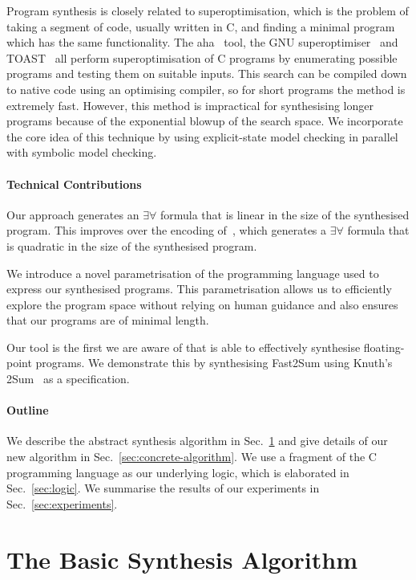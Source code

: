 \documentclass[a4paper]{llncs}
\begin{document}
Program synthesis is closely related to
superoptimisation, which is the problem of taking a
segment of code, usually written in C, and finding a minimal program which
has the same functionality.  The {\sc aha}~\cite{aha-paper} tool, the GNU
superoptimiser~\cite{gnu-superoptimiser} and TOAST~\cite{toast} all perform superoptimisation of C
programs by enumerating possible programs and testing them on suitable
inputs.  This search can be compiled down to native code using an optimising
compiler, so for short programs the method is extremely fast.  However, this
method is impractical for synthesising longer programs because of the
exponential blowup of the search space.  We incorporate the core idea of
this technique by using explicit-state model checking in parallel with
symbolic model checking.

\paragraph{Technical Contributions}
Our approach generates an $\exists \forall$ formula that is linear
in the size of the synthesised program.  This improves over the
encoding of~\cite{brahma}, which generates a $\exists \forall$ formula
that is quadratic in the size of the synthesised program.

We introduce a novel parametrisation of the programming language
used to express our synthesised programs.
This parametrisation allows us to efficiently explore the program space
without relying on human guidance and also ensures that our programs
are of minimal length.

Our tool is the first we are aware of that is able to effectively
synthesise floating-point programs.  We demonstrate this by
synthesising {\sc Fast2Sum} using Knuth's {\sc 2Sum}~\cite{taocp2} as
a specification.

\paragraph{Outline} We describe the abstract synthesis algorithm in
Sec.~\ref{sec:abstract-algorithm} and give details of our new algorithm in
Sec.~\ref{sec:concrete-algorithm}.  We use a fragment of the C programming language
as our underlying logic, which is elaborated in Sec.~\ref{sec:logic}. We
summarise the results of our experiments in Sec.~\ref{sec:experiments}.

\section{The Basic Synthesis Algorithm}
\label{sec:abstract-algorithm}
\end{document}
